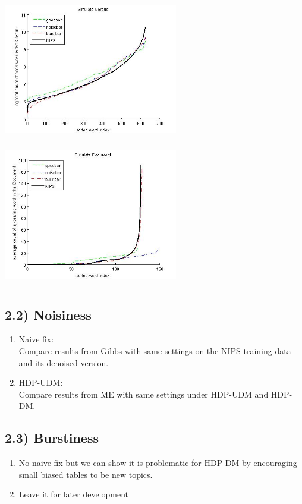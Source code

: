 \documentclass{article}
\begin{document}
\begin{spacing}{1.1}
\begin{center}
\includegraphics[width=3in,height=2.5in]{sc.jpg}\ \includegraphics[width=3in,height=2.5in]{sd.jpg}\\
\end{center}
\subsection{2.2) Noisiness}
\begin{enumerate}
 \item Naive fix:\\
Compare results from Gibbs with same settings on the NIPS training data and its denoised version.
 \item HDP-UDM:\\
Compare results from ME with same settings under HDP-UDM and HDP-DM.
\end{enumerate}
\subsection{2.3) Burstiness}
\begin{enumerate}
 \item No naive fix but we can show it is problematic for HDP-DM by encouraging small biased tables to be new topics. 
 \item Leave it for later development
\end{enumerate}


\end{spacing}
\end{document}
